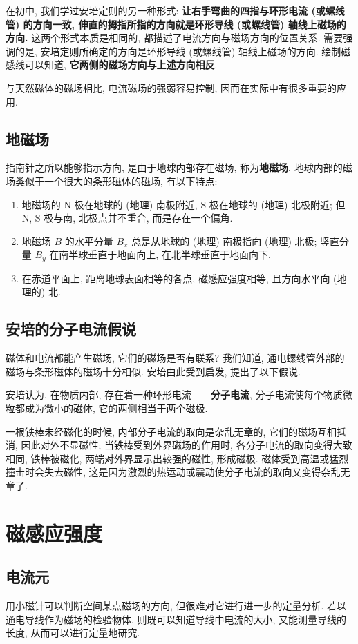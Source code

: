 \documentclass[UTF8,openany,fontset=fandol]{ctexbook}
\theoremstyle{chinesetextbook}
\begin{document}
在初中, 我们学过安培定则的另一种形式: \textbf{让右手弯曲的四指与环形电流 (或螺线管) 的方向一致, 伸直的拇指所指的方向就是环形导线 (或螺线管) 轴线上磁场的方向.} 这两个形式本质是相同的, 都描述了电流方向与磁场方向的位置关系. 需要强调的是, 安培定则所确定的方向是环形导线 (或螺线管) 轴线上磁场的方向. 绘制磁感线可以知道, \textbf{它两侧的磁场方向与上述方向相反}.

与天然磁体的磁场相比, 电流磁场的强弱容易控制, 因而在实际中有很多重要的应用.
\subsection{地磁场}
指南针之所以能够指示方向, 是由于地球内部存在磁场, 称为\textbf{地磁场}. 地球内部的磁场类似于一个很大的条形磁体的磁场, 有以下特点:
\begin{enumerate}
\item 地磁场的 N 极在地球的 (地理) 南极附近, S 极在地球的 (地理) 北极附近; 但 N, S 极与南, 北极点并不重合, 而是存在一个偏角.
\item 地磁场 $B$ 的水平分量 $B_x$ 总是从地球的 (地理) 南极指向 (地理) 北极; 竖直分量 $B_y$ 在南半球垂直于地面向上, 在北半球垂直于地面向下.
\item 在赤道平面上, 距离地球表面相等的各点, 磁感应强度相等, 且方向水平向 (地理的) 北.
\end{enumerate}
\subsection{安培的分子电流假说}
磁体和电流都能产生磁场, 它们的磁场是否有联系? 我们知道, 通电螺线管外部的磁场与条形磁体的磁场十分相似. 安培由此受到启发, 提出了以下假说.

安培认为, 在物质内部, 存在着一种环形电流——\textbf{分子电流}, 分子电流使每个物质微粒都成为微小的磁体, 它的两侧相当于两个磁极.

一根铁棒未经磁化的时候, 内部分子电流的取向是杂乱无章的, 它们的磁场互相抵消, 因此对外不显磁性; 当铁棒受到外界磁场的作用时, 各分子电流的取向变得大致相同, 铁棒被磁化, 两端对外界显示出较强的磁性, 形成磁极. 磁体受到高温或猛烈撞击时会失去磁性, 这是因为激烈的热运动或震动使分子电流的取向又变得杂乱无章了.
\section{磁感应强度}
\subsection{电流元}
用小磁针可以判断空间某点磁场的方向, 但很难对它进行进一步的定量分析. 若以通电导线作为磁场的检验物体, 则既可以知道导线中电流的大小, 又能测量导线的长度, 从而可以进行定量地研究.
\end{document}
